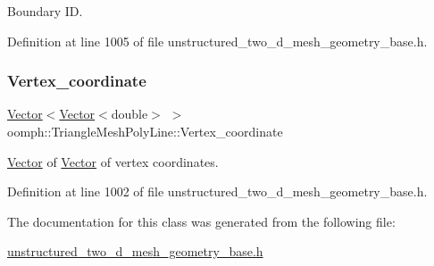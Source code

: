 Boundary ID. 



Definition at line 1005 of file unstructured\+\_\+two\+\_\+d\+\_\+mesh\+\_\+geometry\+\_\+base.\+h.

\mbox{\label{classoomph_1_1TriangleMeshPolyLine_aa54beed8d41904a7e7429e0a59f127e7}} 
\subsubsection{\texorpdfstring{Vertex\+\_\+coordinate}{Vertex\_coordinate}}
{\footnotesize\ttfamily \hyperlink{classoomph_1_1Vector}{Vector}$<$\hyperlink{classoomph_1_1Vector}{Vector}$<$double$>$ $>$ oomph\+::\+Triangle\+Mesh\+Poly\+Line\+::\+Vertex\+\_\+coordinate\hspace{0.3cm}{\ttfamily [private]}}



\hyperlink{classoomph_1_1Vector}{Vector} of \hyperlink{classoomph_1_1Vector}{Vector} of vertex coordinates. 



Definition at line 1002 of file unstructured\+\_\+two\+\_\+d\+\_\+mesh\+\_\+geometry\+\_\+base.\+h.



The documentation for this class was generated from the following file\+:\begin{DoxyCompactItemize}
\item 
\hyperlink{unstructured__two__d__mesh__geometry__base_8h}{unstructured\+\_\+two\+\_\+d\+\_\+mesh\+\_\+geometry\+\_\+base.\+h}\end{DoxyCompactItemize}
